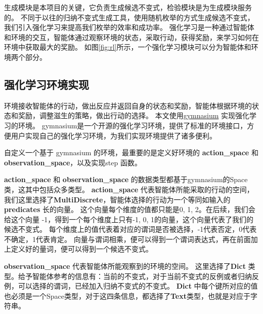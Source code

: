 生成模块是本项目的关键，它负责生成候选不变式，检验模块是为生成模块服务的。
不同于以往的归纳不变式生成工具，使用随机枚举的方式生成候选不变式，我们引入强化学习来提高我们枚举的效率和成功率。
强化学习是一种通过智能体和环境的交互，智能体通过观察环境的状态，采取行动，获得奖励，来学习如何在环境中获取最大的奖励。
如图\ref{fig:rl}所示，一个强化学习模块可以分为智能体和环境两个部分。

\subsection{强化学习环境实现}

环境接收智能体的行动，做出反应并返回自身的状态和奖励，智能体根据环境的状态和奖励，调整滋生的策略，做出行动的选择。
本文使用\href{https://gymnasium.farama.org/}{gymnasium} \cite{gymnasium} 实现强化学习的环境。
gymnasium是一个开源的强化学习环境，提供了标准的环境接口，方便用户实现自己的强化学习环境，为我们实现环境提供了诸多便利。

自定义一个基于 gymnasium 的环境，最重要的是定义好环境的 \textbf{action\_space} 和 \textbf{observation\_space}，以及实现step 函数。

\textbf{action\_space} 和 \textbf{observation\_space} 的数据类型都基于gymnasium的Space类，这其中包括众多类型。
\textbf{action\_space} 代表智能体所能采取的行动的空间，我们这里选择了\textbf{MultiDiscrete}，智能体选择的行动为一个等同如输入的 \textbf{predicates} 长的向量。
这个向量每个维度的值都只能是0, 1, 2。在后续，我们会给这个向量 -1，得到一个每个维度上只有-1, 0, 1的向量，这个向量代表了我们的候选不变式。
每个维度上的值代表着对应的谓词是否被选择，-1代表否定，0代表不确定，1代表肯定。
向量与谓词相乘，便可以得到一个谓词表达式，再在前面加上定义好的量词，便可以得到一个候选不变式。

\textbf{observation\_space} 代表智能体所能观察到的环境的空间。
这里选择了\textbf{Dict} 类型。给予智能体参考的信息有：当前的不变式，对于当前不变式的反例或者归纳反例，可以选择的谓词，已经加入归纳不变式的不变式。
\textbf{Dict} 中每个键所对应的值也必须是一个Space类型，对于这四条信息，都选择了\textbf{Text}类型，也就是对应于字符串。

